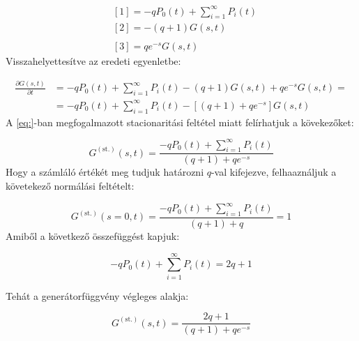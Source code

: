 \begin{align}
    &[1] = - q P_{0} \left( t \right)
    +
    \sum_{i=1}^{\infty} P_{i} \left( t \right)
    \\
    &[2] = - \left( q + 1 \right) G \left( s, t \right)
    \\ \nonumber \\
    &[3] = q e^{-s} G \left( s, t \right)
\end{align}
Visszahelyettesítve az eredeti egyenletbe:

\begin{align}
    \frac{\partial G \left( s, t \right)}{\partial t}
    &=
    - q P_{0} \left( t \right)
    +
    \sum_{i=1}^{\infty} P_{i} \left( t \right)
    -
    \left( q + 1 \right) G \left( s, t \right)
    +
    q e^{-s} G \left( s, t \right)
    = \nonumber \\
    &=
    - q P_{0} \left( t \right)
    +
    \sum_{i=1}^{\infty} P_{i} \left( t \right)
    -
    \left[ \left( q + 1 \right)
    +
    q e^{-s} \right] G \left( s, t \right)
\end{align}
A \ref{eq:}-ban megfogalmazott stacionaritási feltétel miatt felírhatjuk a kövekezőket:

\begin{equation}
    G^{\left( \text{st.} \right)} \left( s, t \right)
    =
    \frac{- q P_{0} \left( t \right)
    +
    \sum_{i=1}^{\infty} P_{i} \left( t \right)}
    {\left( q + 1 \right)
    +
    q e^{-s}}
\end{equation}
Hogy a számláló értékét meg tudjuk határozni $q$-val kifejezve, felhaaználjuk a követekező normálási feltételt:

\begin{equation}
    G^{\left( \text{st.} \right)} \left( s = 0, t \right)
    =
    \frac{- q P_{0} \left( t \right)
    +
    \sum_{i=1}^{\infty} P_{i} \left( t \right)}
    {\left( q + 1 \right)
    +
    q}
    =
    1
\end{equation}
Amiből a következő összefüggést kapjuk:

\begin{equation}
    - q P_{0} \left( t \right)
    +
    \sum_{i=1}^{\infty} P_{i} \left( t \right)
    =
    2q + 1
\end{equation}

Tehát a generátorfüggvény végleges alakja:

\begin{equation}
    G^{\left( \text{st.} \right)} \left( s, t \right)
    =
    \frac{2q + 1}
    {\left( q + 1 \right)
    +
    q e^{-s}}
\end{equation}


